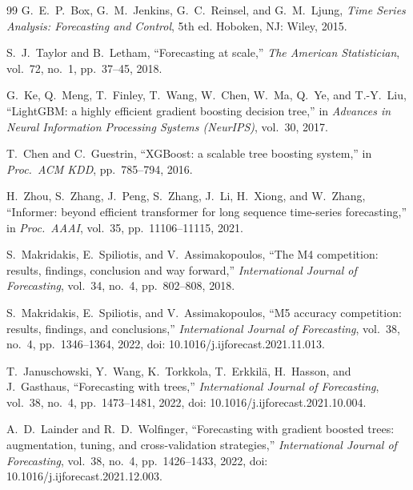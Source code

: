 \documentclass[conference]{IEEEtran}
\begin{document}
  \begin{thebibliography}{99}
     G.\ E.\ P.\ Box, G.\ M.\ Jenkins, G.\ C.\ Reinsel, and G.\ M.\ Ljung,
      \textit{Time Series Analysis: Forecasting and Control}, 5th ed. Hoboken,
      NJ: Wiley, 2015.

     S.\ J.\ Taylor and B.\ Letham, ``Forecasting at scale,''
      \textit{The American Statistician}, vol.\ 72, no.\ 1, pp.\ 37--45, 2018.

     G.\ Ke, Q.\ Meng, T.\ Finley, T.\ Wang, W.\ Chen, W.\ Ma,
      Q.\ Ye, and T.-Y.\ Liu, ``LightGBM: a highly efficient gradient boosting decision
      tree,'' in \textit{Advances in Neural Information Processing Systems (NeurIPS)},
      vol.\ 30, 2017.

     T.\ Chen and C.\ Guestrin, ``XGBoost: a scalable tree
      boosting system,'' in \textit{Proc.\ ACM KDD}, pp.\ 785--794, 2016.

     H.\ Zhou, S.\ Zhang, J.\ Peng, S.\ Zhang, J.\ Li, H.\ Xiong,
      and W.\ Zhang, ``Informer: beyond efficient transformer for long sequence
      time-series forecasting,'' in \textit{Proc.\ AAAI}, vol.\ 35, pp.\ 11106--11115,
      2021.

     S.\ Makridakis, E.\ Spiliotis, and V.\ Assimakopoulos,
      ``The M4 competition: results, findings, conclusion and way forward,'' \textit{International
      Journal of Forecasting}, vol.\ 34, no.\ 4, pp.\ 802--808, 2018.

     S.\ Makridakis, E.\ Spiliotis, and V.\ Assimakopoulos,
      ``M5 accuracy competition: results, findings, and conclusions,'' \textit{International
      Journal of Forecasting}, vol.\ 38, no.\ 4, pp.\ 1346--1364, 2022, doi:
      10.1016/j.ijforecast.2021.11.013.

     T.\ Januschowski, Y.\ Wang, K.\ Torkkola,
      T.\ Erkkil\"{a}, H.\ Hasson, and J.\ Gasthaus, ``Forecasting with trees,''
      \textit{International Journal of Forecasting}, vol.\ 38, no.\ 4, pp.\ 1473--1481,
      2022, doi: 10.1016/j.ijforecast.2021.10.004.

     A.\ D.\ Lainder and R.\ D.\ Wolfinger, ``Forecasting
      with gradient boosted trees: augmentation, tuning, and cross-validation strategies,''
      \textit{International Journal of Forecasting}, vol.\ 38, no.\ 4, pp.\ 1426--1433,
      2022, doi: 10.1016/j.ijforecast.2021.12.003.


\end{thebibliography}
\end{document}
